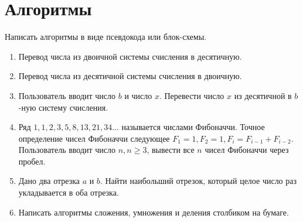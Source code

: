 \documentclass[12pt]{article}
\begin{document}
\section{Алгоритмы}
 Написать алгоритмы в виде псевдокода или блок-схемы.
 \begin{enumerate}
  \item Перевод числа из двоичной системы счисления в десятичную.
  \item Перевод числа из десятичной системы счисления в двоичную.
  \item Пользователь вводит число $b$ и число $x$. Перевести число $x$ из десятичной в $b$-ную систему счисления. 
  \item Ряд $1, 1, 2, 3, 5, 8, 13, 21, 34...$ называется числами Фибоначчи. Точное определение чисел Фибоначчи следующее $F_1 =1, F_2=1, F_i=F_{i-1}+F_{i-2}$. Пользователь вводит число $n, n\geq3$, вывести все $n$ чисел Фибоначчи через пробел.
  \item Дано два отрезка $a$ и $b$. Найти наибольший отрезок, который целое число раз укладывается в оба отрезка.
  \item Написать алгоритмы сложения, умножения и деления столбиком на бумаге.
 \end{enumerate}
\end{document}
